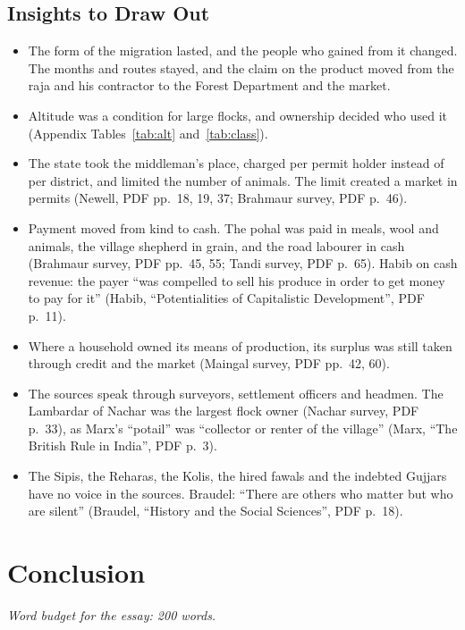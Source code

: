 \documentclass[11pt,a4paper]{article}
\newcommand{\cit}[1]{{\small(#1)}}
\newcommand{\budget}[1]{\par\noindent\textit{Word budget for the essay: #1 words.}\par\smallskip}
\newcommand{\Braudel}{Braudel, \enquote{History and the Social Sciences}}
\newcommand{\Habib}{Habib, \enquote{Potentialities of Capitalistic Development}}
\begin{document}
\subsection{Insights to Draw Out}
\begin{itemize}
\item The form of the migration lasted, and the people who gained from it
  changed. The months and routes stayed, and the claim on the product moved
  from the raja and his contractor to the Forest Department and the market.
\item Altitude was a condition for large flocks, and ownership decided who used
  it \cit{Appendix Tables~\ref{tab:alt} and~\ref{tab:class}}.
\item The state took the middleman's place, charged per permit holder instead
  of per district, and limited the number of animals. The limit created a
  market in permits \cit{Newell, PDF pp.~18, 19, 37; Brahmaur survey, PDF
  p.~46}.
\item Payment moved from kind to cash. The pohal was paid in meals, wool and
  animals, the village shepherd in grain, and the road labourer in cash
  \cit{Brahmaur survey, PDF pp.~45, 55; Tandi survey, PDF p.~65}. Habib on
  cash revenue: the payer \enquote{was compelled to sell his produce in order to
  get money to pay for it} \cit{\Habib, PDF p.~11}.
\item Where a household owned its means of production, its surplus was still
  taken through credit and the market \cit{Maingal survey, PDF pp.~42, 60}.
\item The sources speak through surveyors, settlement officers and headmen. The
  Lambardar of Nachar was the largest flock owner \cit{Nachar survey, PDF
  p.~33}, as Marx's \enquote{potail} was \enquote{collector or renter of the
  village} \cit{Marx, \enquote{The British Rule in India}, PDF p.~3}.
\item The Sipis, the Reharas, the Kolis, the hired fawals and the indebted
  Gujjars have no voice in the sources. Braudel: \enquote{There are others who
  matter but who are silent} \cit{\Braudel, PDF p.~18}.
\end{itemize}

\section{Conclusion}
\budget{200}
\end{document}
